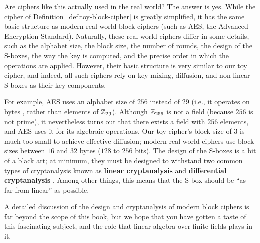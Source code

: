 \documentclass{ximera}
\begin{document}
Are ciphers like this actually used in the real world? The answer
is yes. While the cipher of Definition~\ref{def:toy-block-cipher} is
greatly simplified, it has the same basic structure as modern
real-world block ciphers (such as AES, the Advanced Encryption
Standard). Naturally, these real-world ciphers differ in some details,
such as the alphabet size, the block size, the number of rounds, the
design of the S-boxes, the way the key is computed, and the precise
order in which the operations are applied. However, their basic
structure is very similar to our toy cipher, and indeed, all such
ciphers rely on key mixing, diffusion, and non-linear S-boxes as
their key components.

For example, AES uses an alphabet size of $256$ instead of $29$ (i.e.,
it operates on bytes%
, rather than elements of $\mathbb{Z}_{29}$). Although $\mathbb{Z}_{256}$
is not a field (because $256$ is not prime), it nevertheless turns out
that there exists a field with $256$ elements, and AES uses it for its
algebraic operations. Our toy cipher's block size of $3$ is much too
small to achieve effective diffusion; modern real-world ciphers use
block sizes between $16$ and $32$ bytes ($128$ to $256$ bits). The
design of the S-boxes is a bit of a black art; at minimum, they must
be designed to withstand two common types of cryptanalysis known as
\textbf{linear cryptanalysis}%
%
 and \textbf{differential cryptanalysis}%
%
.  Among other things, this means
that the S-box should be ``as far from linear'' as possible.

A detailed discussion of the design and cryptanalysis of modern block
ciphers is far beyond the scope of this book, but we hope that you
have gotten a taste of this fascinating subject, and the role that
linear algebra over finite fields plays in it.
\end{document}
